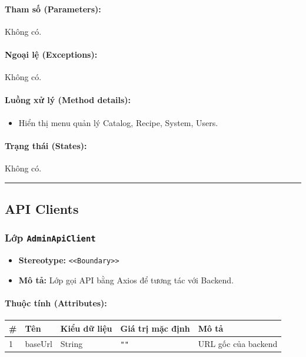 \documentclass[12pt,a4paper]{article}
\begin{document}
\paragraph{Tham số (Parameters):}
Không có.

\paragraph{Ngoại lệ (Exceptions):}
Không có.

\paragraph{Luồng xử lý (Method details):}
\begin{itemize}[leftmargin=*]
    \item Hiển thị menu quản lý Catalog, Recipe, System, Users.
\end{itemize}


\paragraph{Trạng thái (States):}
Không có.

\vskip 0.5cm
\noindent\rule{\textwidth}{0.5pt}
\vskip 0.5cm

\subsection{API Clients}

\subsubsection{Lớp \texttt{AdminApiClient}}
\begin{itemize}[leftmargin=*]
    \item \textbf{Stereotype:} \texttt{\textless{}\textless{}Boundary\textgreater{}\textgreater{}}
    \item \textbf{Mô tả:} Lớp gọi API bằng Axios để tương tác với Backend.
\end{itemize}

\paragraph{Thuộc tính (Attributes):}
\begin{longtable}{|p{0.6cm}|p{2.8cm}|p{2.2cm}|p{1.8cm}|p{5.8cm}|}
\hline
\textbf{\#} & \textbf{Tên} & \textbf{Kiểu dữ liệu} & \textbf{Giá trị mặc định} & \textbf{Mô tả} \\ \hline
\endhead
1 & baseUrl & String & \texttt{""} & URL gốc của backend \\ \hline
\end{longtable}
\end{document}
